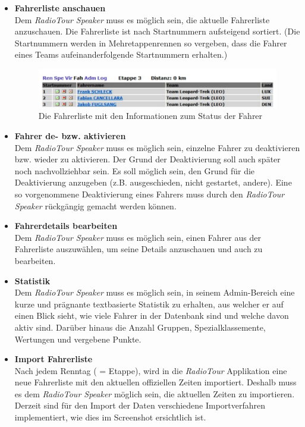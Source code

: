\begin{itemize}
\item \textbf{Fahrerliste anschauen}\\
Dem \textit{RadioTour Speaker} muss es möglich sein, die aktuelle Fahrerliste anzuschauen. Die Fahrerliste ist nach Startnummern aufsteigend sortiert. (Die Startnummern werden in Mehretappenrennen so vergeben, dass die Fahrer eines Teams aufeinanderfolgende Startnummern erhalten.)

\begin{figure}[h!]
  \caption{Die Fahrerliste mit den Informationen zum Status der Fahrer}
  \begin{center}
    \includegraphics[scale=0.8]{05bericht/images/uc06_fahrerliste.png}
  \end{center}
\end{figure}

\item \textbf{Fahrer de- bzw. aktivieren}\\
Dem \textit{RadioTour Speaker} muss es möglich sein, einzelne Fahrer zu deaktivieren bzw. wieder zu aktivieren. Der Grund der Deaktivierung soll auch später noch nachvollziehbar sein. Es soll möglich sein, den Grund für die Deaktivierung anzugeben (z.B. ausgeschieden, nicht gestartet, andere).
Eine so vorgenommene Deaktivierung eines Fahrers muss durch den \textit{RadioTour Speaker} rückgängig gemacht werden können.

\item \textbf{Fahrerdetails bearbeiten}\\
Dem \textit{RadioTour Speaker} muss es möglich sein, einen Fahrer aus der Fahrerliste auszuwählen, um seine Details anzuschauen und auch zu bearbeiten. 

\item \textbf{Statistik}\\
Dem \textit{RadioTour Speaker} muss es möglich sein, in seinem Admin-Bereich eine kurze und prägnante textbasierte Statistik zu erhalten, aus welcher er auf einen Blick sieht, wie viele Fahrer in der Datenbank sind und welche davon aktiv sind. Darüber hinaus die Anzahl Gruppen, Spezialklassemente, Wertungen und vergebene Punkte.

\item \textbf{Import Fahrerliste}\\
Nach jedem Renntag ( = Etappe), wird in die \textit{RadioTour} Applikation eine neue Fahrerliste mit den aktuellen offiziellen Zeiten importiert. Deshalb muss es dem \textit{RadioTour Speaker} möglich sein, die aktuellen Zeiten zu importieren. Derzeit sind für den Import der Daten verschiedene Importverfahren implementiert, wie dies im Screenshot ersichtlich ist.


\end{itemize}
